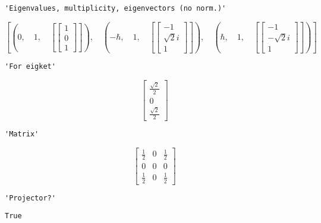 \documentclass[11pt]{article}
\begin{document}
    
    \begin{verbatim}
'Eigenvalues, multiplicity, eigenvectors (no norm.)'
    \end{verbatim}

    
    $$\left [ \left ( 0, \quad 1, \quad \left [ \left[\begin{matrix}1\\0\\1\end{matrix}\right]\right ]\right ), \quad \left ( - \hbar, \quad 1, \quad \left [ \left[\begin{matrix}-1\\\sqrt{2} i\\1\end{matrix}\right]\right ]\right ), \quad \left ( \hbar, \quad 1, \quad \left [ \left[\begin{matrix}-1\\- \sqrt{2} i\\1\end{matrix}\right]\right ]\right )\right ]$$

    
    
    \begin{verbatim}
'For eigket'
    \end{verbatim}

    
    $$\left[\begin{matrix}\frac{\sqrt{2}}{2}\\0\\\frac{\sqrt{2}}{2}\end{matrix}\right]$$

    
    
    \begin{verbatim}
'Matrix'
    \end{verbatim}

    
    $$\left[\begin{matrix}\frac{1}{2} & 0 & \frac{1}{2}\\0 & 0 & 0\\\frac{1}{2} & 0 & \frac{1}{2}\end{matrix}\right]$$

    
    
    \begin{verbatim}
'Projector?'
    \end{verbatim}

    
    
    \begin{verbatim}
True
    \end{verbatim}
\end{document}
